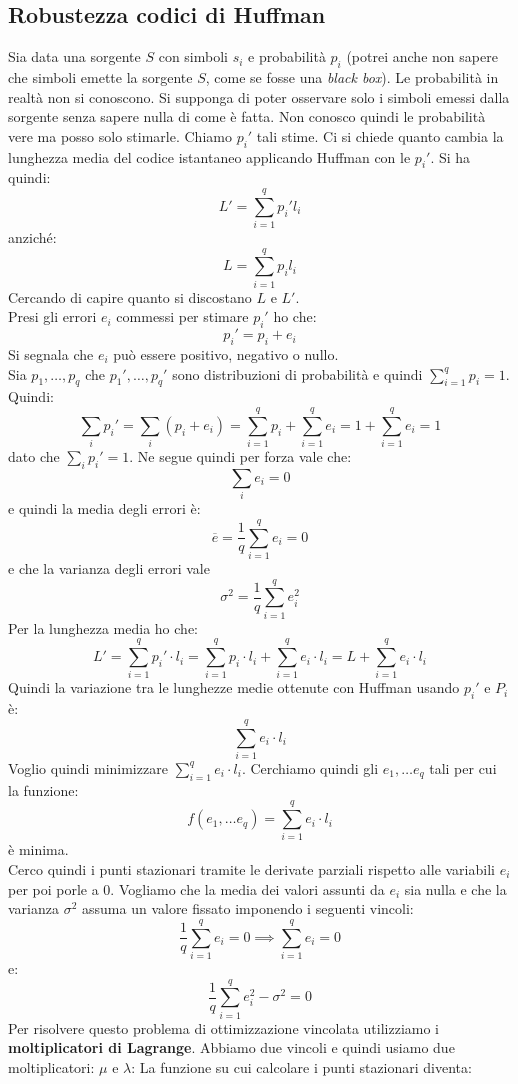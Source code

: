 \documentclass[a4paper,12pt, oneside]{book}
\begin{document}
\subsection{Robustezza codici di Huffman}
Sia data una sorgente $S$ con simboli $s_i$ e probabilità $p_i$ (potrei anche
non sapere che simboli emette la sorgente $S$, come se fosse una \textit{black
  box}). Le probabilità in realtà non si conoscono. Si supponga di 
poter osservare solo i simboli emessi dalla sorgente senza sapere nulla di come
è fatta. Non conosco quindi le probabilità vere ma posso solo stimarle. Chiamo
$p_i'$ tali stime. Ci si chiede quanto cambia la lunghezza media del codice
istantaneo applicando Huffman con le $p_i'$. Si ha quindi:
\[L'=\sum_{i=1}^q p_i'l_i\]
anziché:
\[L=\sum_{i=1}^q p_il_i\]
Cercando di capire quanto si discostano $L$ e $L'$.\\
Presi gli errori $e_i$ commessi per stimare $p_i'$ ho che:
\[p_i'=p_i+e_i\]
Si segnala che $e_i$ può essere positivo, negativo o nullo.\\
Sia $p_1,\ldots, p_q$ che $p_1',\ldots, p_q'$ sono distribuzioni di probabilità
e quindi $\sum_{i=1}^q p_i=1$.\\
Quindi:
\[\sum_ip_i'=\sum_i (p_i+e_i)=\sum_{i=1}^q p_i+\sum_{i=1}^q e_i=1+\sum_{i=1}^q
  e_i=1\] 
dato che $\sum_ip_i'=1$. Ne segue quindi per forza vale che:
\[\sum_i e_i=0\]
e quindi la media degli errori è:
\[\overline{e}=\frac{1}{q}\sum_{i=1}^q e_i=0\]
e che la varianza degli errori vale
\[\sigma^2=\frac{1}{q}\sum_{i=1}^q e_i^2\]
Per la lunghezza media ho che:
\[L'=\sum_{i=1}^q p_i'\cdot l_i=\sum_{i=1}^q p_i\cdot l_i+\sum_{i=1}^q e_i\cdot
  l_i=L+\sum_{i=1}^q e_i\cdot l_i\]
Quindi la variazione tra le lunghezze medie ottenute con Huffman usando $p_i'$ e
$P_i$ è:
\[\sum_{i=1}^q e_i\cdot l_i\]
Voglio quindi minimizzare $\sum_{i=1}^q e_i\cdot l_i$. Cerchiamo quindi gli
$e_1,\ldots e_q$ tali per cui la funzione:
\[f(e_1,\ldots e_q)=\sum_{i=1}^q e_i\cdot l_i\]
è minima.\\
Cerco quindi i punti stazionari tramite le derivate parziali rispetto alle
variabili $e_i$ per poi porle a 0. Vogliamo che la media dei valori assunti da
$e_i$ sia nulla e che la varianza $\sigma^2$ assuma un valore fissato imponendo
i seguenti vincoli:
\[\frac{1}{q}\sum_{i=1}^q e_i=0\implies \sum_{i=1}^q e_i=0\]
e:
\[\frac{1}{q}\sum_{i=1}^q e_i^2-\sigma^2 =0\]
Per risolvere questo problema di ottimizzazione vincolata utilizziamo i
\textbf{moltiplicatori di Lagrange}. Abbiamo due vincoli e quindi usiamo due
moltiplicatori: $\mu$ e $\lambda$:
La funzione su cui calcolare i punti stazionari diventa:
\end{document}
